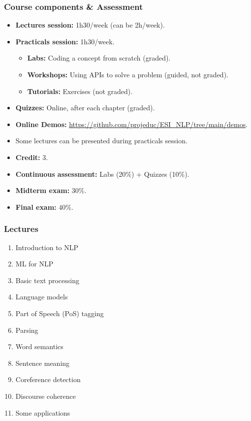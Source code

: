 \documentclass{beamer}
\begin{document}
\begin{frame}
\frametitle{Course components \& Assessment}

\begin{itemize}
	\item \textbf{Lectures session:} 1h30/week (can be 2h/week).
	\item \textbf{Practicals session:} 1h30/week.
	\begin{itemize}
		\item \textbf{Labs:} Coding a concept from scratch (graded).
		\item \textbf{Workshops:} Using APIs to solve a problem (guided, not graded).
		\item \textbf{Tutorials:} Exercises (not graded).
	\end{itemize}
	\item \textbf{Quizzes:} Online, after each chapter (graded).
	\item \textbf{Online Demos:} {\scriptsize\url{https://github.com/projeduc/ESI_NLP/tree/main/demos}}.
	\item Some lectures can be presented during practicals session.
\end{itemize}

\vfill

\begin{itemize}
	\item \textbf{Credit:} 3.
	\item \textbf{Continuous assessment:} Labs (20\%) + Quizzes (10\%).
	\item \textbf{Midterm exam:} 30\%.
	\item \textbf{Final exam:} 40\%.
\end{itemize}

\end{frame}

\begin{frame}
\frametitle{Lectures}

\begin{enumerate}
	\item Introduction to NLP
	\item ML for NLP
	\item Basic text processing
	\item Language models
	\item Part of Speech (PoS) tagging
	\item Parsing
	\item Word semantics
	\item Sentence meaning
	\item Coreference detection
	\item Discourse coherence
	\item Some applications
\end{enumerate}

\end{frame}
\end{document}

